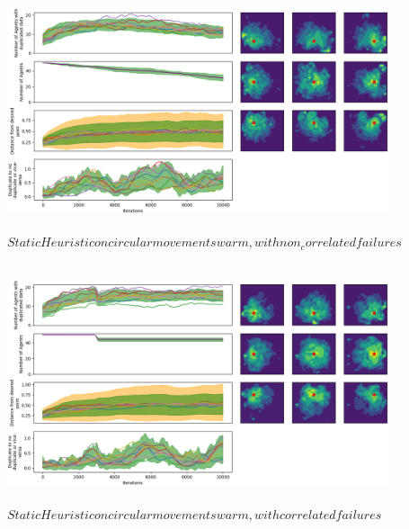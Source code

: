 \documentclass{UoYCSproject}
\begin{document}
\begin{figure}[htb]
\label{fig:circle_movement_non}
\begin{center}
\centering
\includegraphics[height=7cm]{"./Static_Heuristic/circle_movement_non.png"}
\caption{$Static Heuristic on circular movement swarm, with non_correlated failures$}
\end{center}
\end{figure}

\begin{figure}[htb]
\label{fig:circle_movement_con}
\begin{center}
\centering
\includegraphics[height=7cm]{"./Static_Heuristic/circle_movement_con.png"}
\caption{$Static Heuristic on circular movement swarm, with correlated failures$}
\end{center}
\end{figure}
\end{document}
